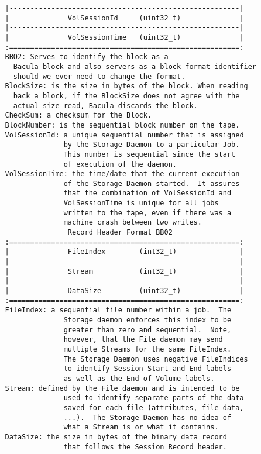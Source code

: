 \begin{verbatim}
   |-------------------------------------------------------|
   |              VolSessionId     (uint32_t)              |
   |-------------------------------------------------------|
   |              VolSessionTime   (uint32_t)              |
   :=======================================================:
   BBO2: Serves to identify the block as a
     Bacula block and also servers as a block format identifier
     should we ever need to change the format.
   BlockSize: is the size in bytes of the block. When reading
     back a block, if the BlockSize does not agree with the
     actual size read, Bacula discards the block.
   CheckSum: a checksum for the Block.
   BlockNumber: is the sequential block number on the tape.
   VolSessionId: a unique sequential number that is assigned
                 by the Storage Daemon to a particular Job.
                 This number is sequential since the start
                 of execution of the daemon.
   VolSessionTime: the time/date that the current execution
                 of the Storage Daemon started.  It assures
                 that the combination of VolSessionId and
                 VolSessionTime is unique for all jobs
                 written to the tape, even if there was a
                 machine crash between two writes.
                  Record Header Format BB02
   :=======================================================:
   |              FileIndex        (int32_t)               |
   |-------------------------------------------------------|
   |              Stream           (int32_t)               |
   |-------------------------------------------------------|
   |              DataSize         (uint32_t)              |
   :=======================================================:
   FileIndex: a sequential file number within a job.  The
                 Storage daemon enforces this index to be
                 greater than zero and sequential.  Note,
                 however, that the File daemon may send
                 multiple Streams for the same FileIndex.
                 The Storage Daemon uses negative FileIndices
                 to identify Session Start and End labels
                 as well as the End of Volume labels.
   Stream: defined by the File daemon and is intended to be
                 used to identify separate parts of the data
                 saved for each file (attributes, file data,
                 ...).  The Storage Daemon has no idea of
                 what a Stream is or what it contains.
   DataSize: the size in bytes of the binary data record
                 that follows the Session Record header.

\end{verbatim}
